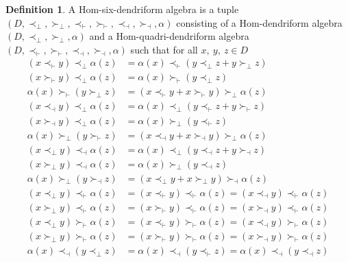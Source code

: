 \documentclass[11pt,twoside,reqno]{amsart}
\theoremstyle{plain}
\theoremstyle{definition}
\newtheorem{definition}[thm]{Definition}
\begin{document}
\begin{definition}\label{d14}
A Hom-six-dendriform algebra is a tuple $(D, \prec_\perp,\succ_\perp,\prec_\vdash, \succ_\vdash,\prec_\dashv,\succ_\dashv,\alpha)$
consisting of a  Hom-dendriform algebra $(D,\prec_\perp,\succ_\perp,\alpha)$ and a Hom-quadri-dendriform algebra  $(D,\prec_\vdash, \succ_\vdash,\prec_\dashv,\succ_\dashv, \alpha)$
such that  for all $ x,\ y,\  z \in D $
\begin{align}
(x \prec_\vdash y) \prec_\perp \alpha(z) &= \alpha(x) \prec_\vdash (y \prec_\perp z + y \succ_\perp z) \label{sq1}  \\
(x \succ_\vdash y) \prec_\perp \alpha(z) &= \alpha(x) \succ_\vdash (y \prec_\perp z) \label{sq2}\\
\alpha(x) \succ_\vdash (y \succ_\perp z) &= (x \prec_\vdash y + x \succ_\vdash y) \succ_\perp\alpha(z) \label{sq3}\\
(x \prec_\dashv y) \prec_\perp \alpha( z) &= \alpha(x) \prec_\perp (y \prec_\vdash z + y \succ_\vdash z) \label{sq4}\\
(x \succ_\dashv y) \prec_\perp \alpha(z) &= \alpha(x)\succ_\perp (y \prec_\vdash z) \label{sq5}\\
\alpha(x)\succ_\perp (y \succ_\vdash z) &= (x \prec_\dashv y + x \succ_\dashv y) \succ_\perp \alpha(z) \label{sq6}\\
(x \prec_\perp y) \prec_\dashv \alpha(z) &= \alpha(x) \prec_\perp (y \prec_\dashv z + y \succ_\dashv z) \label{sq7} \\
(x \succ_\perp y) \prec_\dashv \alpha(z) &= \alpha(x) \succ_\perp (y \prec_\dashv z) \label{sq8}\\
\alpha(x)\succ_\perp (y \succ_\dashv z) &= (x \prec_\perp y + x \succ_\perp y) \succ_\dashv \alpha(z) \label{sq9}\\
(x \prec_\perp y) \prec_\vdash \alpha(z) &= (x \prec_\vdash y) \prec_\vdash \alpha(z) = (x \prec_\dashv y) \prec_\vdash \alpha(z) \label{sq10}\\
(x \succ_\perp y) \prec_\vdash\alpha(z) &= (x \succ_\vdash y) \prec_\vdash \alpha(z) = (x \succ_\dashv y) \prec_\vdash \alpha(z) \label{sq11}\\
(x \prec_\perp y) \succ_\vdash\alpha(z) &= (x \prec_\vdash y) \succ_\vdash \alpha( z) = (x \prec_\dashv y) \succ_\vdash\alpha(z) \label{sq12}\\
(x \succ_\perp y) \succ_\vdash \alpha(z) &= (x \succ_\vdash y) \succ_\vdash\alpha(z) = (x \succ_\dashv y) \succ_\vdash\alpha(z) \label{sq13}\\
\alpha(x) \prec_\dashv (y \prec_\perp z) &=\alpha(x) \prec_\dashv (y \prec_\vdash z) = \alpha(x) \prec_\dashv (y \prec_\dashv z) \label{sq14}\\

\end{align}
\end{definition}
\end{document}
